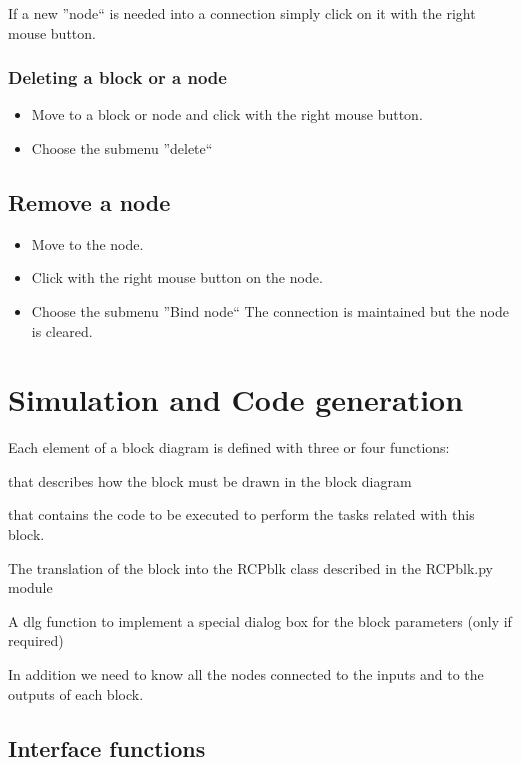 If a new ''node`` is needed into a connection simply click on it with the right 
mouse button.

\subsection{Deleting a block or a node}
\begin{itemize}
\item Move to a block or node and click with the right mouse button.
\item Choose the submenu ''delete``
\end{itemize}

\section{Remove a node}
\begin{itemize}
\item Move to the node.
\item Click with the right mouse button on the node. 
\item Choose the submenu ''Bind node`` The connection is maintained 
but the node is cleared.
\end{itemize}

\chapter{Simulation and Code generation}

Each element of a block diagram is defined with three or four functions:

\begin{description}
\item [The interface function] that describes how the block must be drawn in 
the block diagram
\item [The Implementation function] that contains the code  to be executed to 
perform the tasks related with this block.
\item The translation of the block into the RCPblk class described in the 
RCPblk.py module
\item A dlg function to implement a special dialog box for the block parameters 
(only if required)
\end{description}

In addition we need to know all the nodes connected to the inputs and to the 
outputs of each block.

\section{Interface functions}

